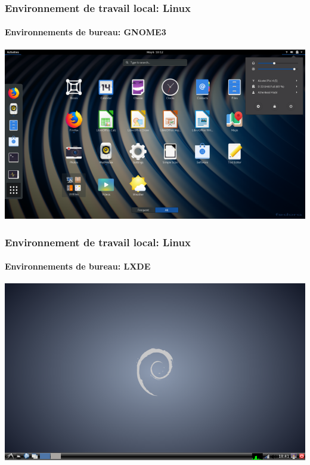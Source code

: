 \documentclass{beamer}
\begin{document}
\begin{frame}
\frametitle{Environnement de travail local: Linux}
\framesubtitle{Environnements de bureau: GNOME3}

\begin{center}
	\includegraphics[height=
.8\textheight]{../img/Bweb01-environnement/gnome.png}
\end{center}

\end{frame}

\begin{frame}
\frametitle{Environnement de travail local: Linux}
\framesubtitle{Environnements de bureau: LXDE}

\begin{center}
	\includegraphics[height=
.8\textheight]{../img/Bweb01-environnement/lxde.png}
\end{center}

\end{frame}
\end{document}
